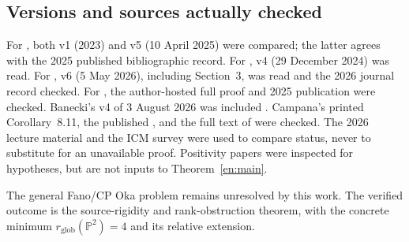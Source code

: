 \documentclass[12pt]{amsart}
\theoremstyle{definition}
\theoremstyle{remark}
\numberwithin{equation}{section}
\newcommand{\mP}{\mathbb{P}}
\begin{document}
\subsection{Versions and sources actually checked}
For \cite{en:AF}, both v1 (2023) and v5 (10 April 2025) were compared; the latter agrees with the 2025 published bibliographic record. For \cite{en:FLone}, v4 (29 December 2024) was read. For \cite{en:FLell}, v6 (5 May 2026), including Section~3, was read and the 2026 journal record checked. For \cite{en:BW}, the author-hosted full proof and 2025 publication were checked. Banecki's v4 of 3 August 2026 was included \cite{en:Banecki}. Campana's printed Corollary~8.11, the published \cite{en:CWhP}, and the full text of \cite{en:CWdense} were checked. The 2026 lecture material and the ICM survey were used to compare status, never to substitute for an unavailable proof. Positivity papers \cite{en:IMZ,en:MQ,en:Muller} were inspected for hypotheses, but are not inputs to Theorem~\ref{en:main}.

The general Fano/CP Oka problem remains unresolved by this work. The verified outcome is the source-rigidity and rank-obstruction theorem, with the concrete minimum $r_{\mathrm{glob}}(\mP^2)=4$ and its relative extension.
\end{document}

